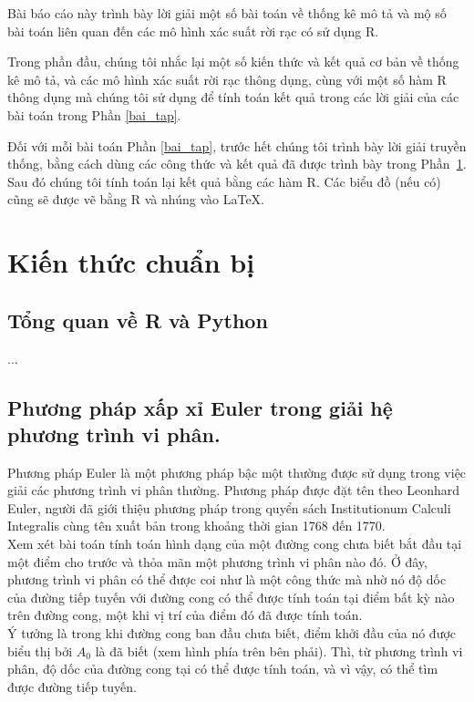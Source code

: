\documentclass[a4paper]{article}
\begin{document}

\newpage
\tableofcontents
\newpage

Bài báo cáo này trình bày lời giải một số bài toán về thống kê mô tả và mộ số bài toán liên quan đến các mô hình xác suất rời rạc có sử dụng R.

Trong phần đầu, chúng tôi nhắc lại một số kiến thức và kết quả cơ bản về thống kê mô tả, và các mô hình xác suất rời rạc thông dụng, cùng với một số hàm R thông dụng mà chúng tôi sử dụng để tính toán kết quả trong các lời giải của các bài toán trong Phần \ref{bai_tap}.

Đối với mỗi bài toán Phần \ref{bai_tap}, trước hết chúng tôi trình bày lời giải truyền thống, bằng cách dùng các công thức và kết quả đã được trình bày trong Phần~\ref{chuan_bi}. Sau đó chúng tôi tính toán lại kết quả bằng các hàm R. Các biểu đồ (nếu có) cũng sẽ được vẽ bằng R và nhúng vào LaTeX.

\section{Kiến thức chuẩn bị}\label{chuan_bi}
\subsection{Tổng quan về R và Python} 
...
\subsection{Phương pháp xấp xỉ Euler trong giải hệ phương trình vi phân.}
Phương pháp Euler là một phương pháp bậc một thường được sử dụng trong việc giải các
phương trình vi phân thường. Phương pháp được đặt tên theo Leonhard Euler, người đã giới
thiệu phương pháp trong quyển sách Institutionum Calculi Integralis cùng tên xuất bản trong
khoảng thời gian 1768 đến 1770.\\

Xem xét bài toán tính toán hình dạng của một đường cong chưa biết bắt đầu tại một điểm cho trước và thỏa mãn một phương trình vi phân nào đó. Ở đây, phương trình vi phân có thể được coi như là một công thức mà nhờ nó độ dốc của đường tiếp tuyến với đường cong có thể được tính toán tại điểm bất kỳ nào trên đường cong, một khi vị trí của điểm đó đã được tính toán.\\

Ý tưởng là trong khi đường cong ban đầu chưa biết, điểm khởi đầu của nó được biểu thị bởi $A_{0}$ là đã biết (xem hình phía trên bên phải). Thì, từ phương trình vi phân, độ dốc của đường cong tại có thể được tính toán, và vì vậy, có thể tìm được đường tiếp tuyến.\\
\end{document}
